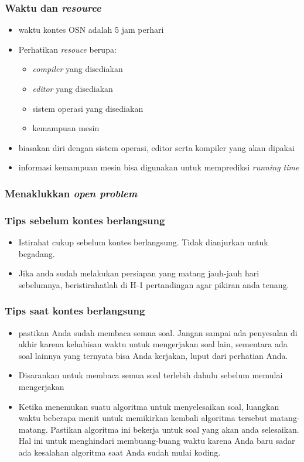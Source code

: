 \begin{frame}
	\frametitle{Waktu dan \textit{resource}}
	\begin{itemize}
		\item waktu kontes OSN adalah 5 jam perhari
		\item Perhatikan \textit{resouce} berupa:
		\begin{itemize}
			\item \textit{compiler} yang disediakan
			\item \textit{editor} yang disediakan
			\item sistem operasi yang disediakan
			\item kemampuan mesin
		\end{itemize}
		\item biasakan diri dengan sistem operasi, editor serta kompiler yang akan dipakai
		\item informasi kemampuan mesin bisa digunakan untuk memprediksi \textit{running time}
	\end{itemize}
\end{frame}

\begin{frame}
	\frametitle{Menaklukkan \textit{open problem}}

\end{frame}

\begin{frame}
	\frametitle{Tips sebelum kontes berlangsung}
	\begin{itemize}
		\item Istirahat cukup sebelum kontes berlangsung. Tidak dianjurkan untuk begadang.
		\item Jika anda sudah melakukan persiapan yang matang jauh-jauh hari sebelumnya, beristirahatlah di H-1 pertandingan agar pikiran anda tenang.

	\end{itemize}
	
\end{frame}


\begin{frame}
	\frametitle{Tips saat kontes berlangsung}
	\begin{itemize}
		\item pastikan Anda sudah membaca semua soal. Jangan sampai ada penyesalan di akhir karena kehabisan waktu untuk mengerjakan soal lain, sementara ada soal lainnya yang ternyata bisa Anda kerjakan, luput dari perhatian Anda.
		\item Disarankan untuk membaca semua soal terlebih dahulu sebelum memulai mengerjakan
		\item Ketika menemukan suatu algoritma untuk menyelesaikan soal, luangkan waktu beberapa menit untuk memikirkan kembali algoritma tersebut matang-matang. Pastikan algoritma ini bekerja untuk soal yang akan anda selesaikan. Hal ini untuk menghindari membuang-buang waktu karena Anda baru sadar ada kesalahan algoritma saat Anda sudah mulai koding.
	\end{itemize}
	
\end{frame}


